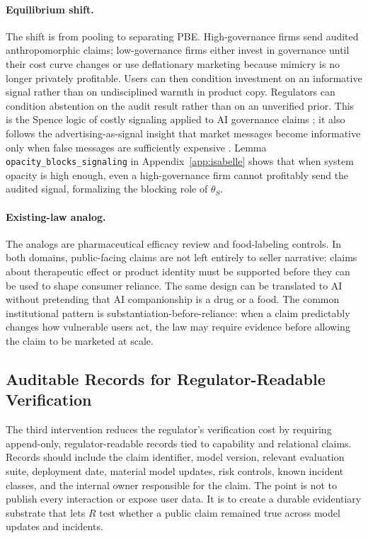 \paragraph{Equilibrium shift.}
The shift is from pooling to separating PBE. High-governance firms send audited
anthropomorphic claims; low-governance firms either invest in governance until
their cost curve changes or use deflationary marketing because mimicry is no longer privately profitable. Users can then condition
investment on an informative signal rather than on undisciplined warmth in
product copy. Regulators can condition abstention on the audit result rather
than on an unverified prior. This is the Spence logic of costly signaling
applied to AI governance claims \citep{spence1973}; it also follows the
advertising-as-signal insight that market messages become informative only when
false messages are sufficiently expensive \citep{milgrom_roberts1986}. Lemma \texttt{opacity\_\allowbreak{}blocks\_\allowbreak{}signaling} in Appendix~\ref{app:isabelle} shows that when system opacity is high enough, even a high-governance firm cannot profitably send the audited signal, formalizing the blocking role of $\theta_S$.

\paragraph{Existing-law analog.}
The analogs are pharmaceutical efficacy review and food-labeling controls. In
both domains, public-facing claims are not left entirely to seller narrative:
claims about therapeutic effect or product identity must be supported before
they can be used to shape consumer reliance. The same design can be translated
to AI without pretending that AI companionship is a drug or a food. The common
institutional pattern is substantiation-before-reliance: when a claim predictably
changes how vulnerable users act, the law may require evidence before allowing
the claim to be marketed at scale.

\subsection{Auditable Records for Regulator-Readable Verification}
\label{subsec:auditable-records}

The third intervention reduces the regulator's verification cost by requiring
append-only, regulator-readable records tied to capability and relational
claims. Records should include the claim identifier, model version, relevant
evaluation suite, deployment date, material model updates, risk controls,
known incident classes, and the internal owner responsible for the claim. The
point is not to publish every interaction or expose user data. It is to create a
durable evidentiary substrate that lets $R$ test whether a public claim remained
true across model updates and incidents.

